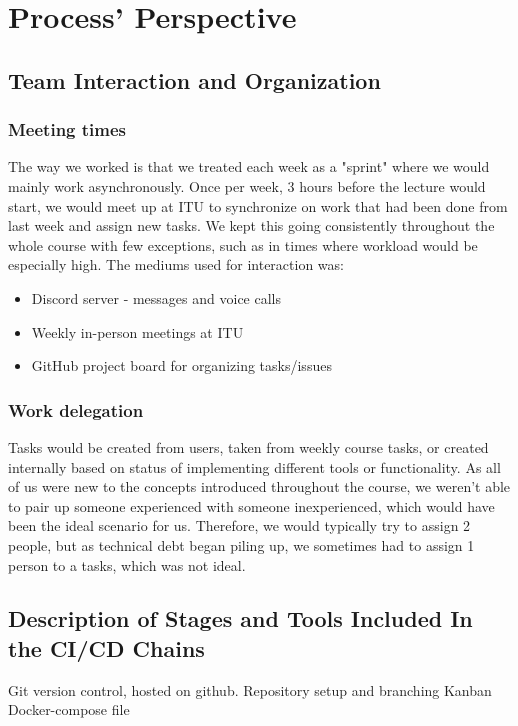 \section{Process' Perspective}


\subsection{Team Interaction and Organization}

\subsubsection{Meeting times}
The way we worked is that we treated each week as a "sprint" where we would mainly work asynchronously. Once per week, 3 hours before the lecture would start, we would meet up at ITU to synchronize on work that had been done from last week and assign new tasks. We kept this going consistently throughout the whole course with few exceptions, such as in times where workload would be especially high.\newline
The mediums used for interaction was:
\begin{itemize}
    \item Discord server - messages and voice calls
    \item Weekly in-person meetings at ITU
    \item GitHub project board for organizing tasks/issues
\end{itemize}

\subsubsection{Work delegation}
Tasks would be created from users, taken from weekly course tasks, or created internally based on status of implementing different tools or functionality.\newline
As all of us were new to the concepts introduced throughout the course, we weren't able to pair up someone experienced with someone inexperienced, which would have been the ideal scenario for us. Therefore, we would typically try to assign 2 people, but as technical debt began piling up, we sometimes had to assign 1 person to a tasks, which was not ideal. 

\subsection{Description of Stages and Tools Included In the CI/CD Chains}
Git version control, hosted on github.
Repository setup and branching
Kanban
Docker-compose file

